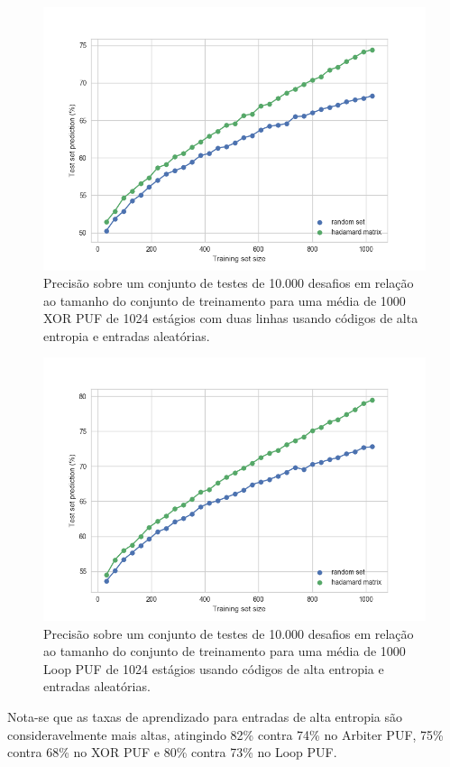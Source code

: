 \documentclass[pdftex,11pt]{article}
\begin{document}
\begin{spacing}{1.5}
\begin{figure}
\label{fig:ml-hadamard-xorpuf}
\centering
\includegraphics[width=12cm]{ml-hadamard-xorpuf.png}
\caption{Precisão sobre um conjunto de testes de 10.000 desafios em relação ao tamanho do conjunto de treinamento para uma média de 1000 XOR PUF de 1024 estágios com duas linhas usando códigos de alta entropia e entradas aleatórias.}
\end{figure}


\begin{figure}
\label{fig:ml-hadamard-looppuf}
\centering
\includegraphics[width=12cm]{ml-hadamard-looppuf.png}
\caption{Precisão sobre um conjunto de testes de 10.000 desafios em relação ao tamanho do conjunto de treinamento para uma média de 1000 Loop PUF de 1024 estágios usando códigos de alta entropia e entradas aleatórias.}
\end{figure}


Nota-se que as taxas de aprendizado para entradas de alta entropia são consideravelmente mais altas, atingindo 82\% contra 74\% no Arbiter PUF,  75\% contra 68\% no XOR PUF e 80\% contra 73\% no Loop PUF.


\end{spacing}
\end{document}
